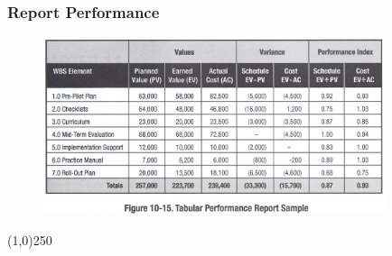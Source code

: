 \begin{frame}
\frametitle{Report Performance}
\begin{figure}
	\centering
		\includegraphics[width = 10cm]{images/Fig10-15.jpg}
	\label{fig:10-15}
\end{figure}
\end{frame}\begin{center}\line(1,0){250}\end{center}




